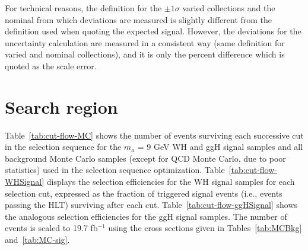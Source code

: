 For technical reasons, the \ETslash definition for the $\pm1\sigma$ varied \ETslash collections and the nominal from which deviations are measured is slightly different from the \ETslash definition used when quoting the expected signal.  However, the deviations for the \ETslash uncertainty calculation are measured in a consistent way (same \ETslash definition for varied and nominal collections), and it is only the percent difference which is quoted as the \ETslash scale error.

\section{Search region \label{sec:evtsel-search}}
Table~\ref{tab:cut-flow-MC} shows the number of events surviving each successive cut in the selection sequence for the $m_a$ = 9 GeV WH and ggH signal samples and all background Monte Carlo samples (except for QCD Monte Carlo, due to poor statistics) used in the selection sequence optimization.  Table~\ref{tab:cut-flow-WHSignal} displays the selection efficiencies for the WH signal samples for each selection cut, expressed as the fraction of triggered signal events (i.e., events passing the HLT) surviving after each cut.  Table~\ref{tab:cut-flow-ggHSignal} shows the analogous selection efficiencies for the ggH signal samples.  The number of events is scaled to 19.7 fb$^{-1}$ using the cross sections given in Tables~\ref{tab:MCBkg} and~\ref{tab:MC-sig}.

